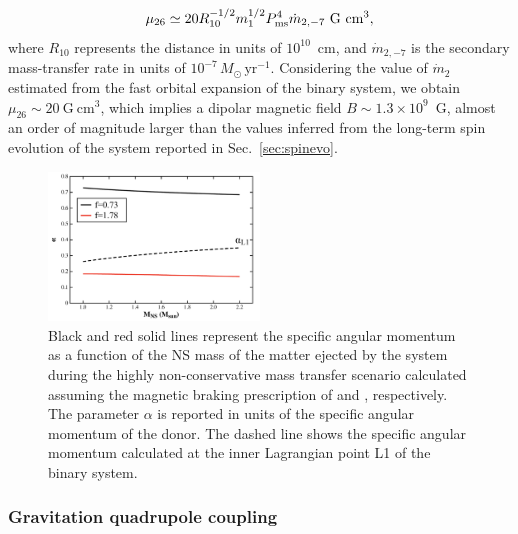 \documentclass[fleqn,usenatbib]{mnras}
\begin{document}
{\begin{equation}           
\mu_{26}\simeq20 R^{-1/2}_{10} m_1^{1/2}P^4_{\rm ms}\dot{m}_{2,-7} ~\text{G}~\text{cm}^3,
\end{equation}
where $R_{10}$ represents the distance in units of $10^{10}$~cm, and $\dot{m}_{2,-7}$ is the secondary mass-transfer rate in units of $10^{-7}\,{M}_\odot\,\text{yr}^{-1}$. Considering the value of $\dot{m}_2$ estimated from the fast orbital expansion of the binary system, we obtain $\mu_{26}\sim 20~\text{G}~\text{cm}^3$, which implies a dipolar magnetic field $B\sim 1.3\times 10^9$~G, almost an order of magnitude larger than the values inferred from the long-term spin evolution of the system reported in Sec.~\ref{sec:spinevo}}.
\begin{figure}
\centering
\includegraphics[width=0.5\textwidth]{alpha_vs_m1_non_conservative}
\caption{Black and red solid lines represent the specific angular momentum as a function of the NS mass of the matter ejected by the system during the highly non-conservative mass transfer scenario calculated assuming the magnetic braking prescription of \citet[][f=0.73]{Skumanich:1972vy} and \citet[][f=1.78]{Smith:1979vn}, respectively. The parameter $\alpha$ is reported in units of the specific angular momentum of the donor. The dashed line shows the specific angular momentum calculated at the inner Lagrangian point L1 of the binary system.}
\label{fig:alpha}
\end{figure} 


\subsubsection*{Gravitation quadrupole coupling} 
\end{document}
